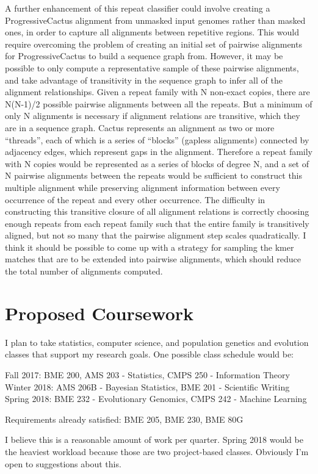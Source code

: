 \documentclass{article}
\begin{document}
A further enhancement of this repeat classifier could involve creating a ProgressiveCactus alignment from unmasked input genomes rather than masked ones, in order to capture all alignments between repetitive regions. This would require overcoming the problem of creating an initial set of pairwise alignments for ProgressiveCactus to build a sequence graph from. However, it may be possible to only compute a representative sample of these pairwise alignments, and take advantage of transitivity in the sequence graph to infer all of the alignment relationships. Given a repeat family with N non-exact copies, there are N(N-1)/2 possible pairwise alignments between all the repeats. But a minimum of only N alignments is necessary if alignment relations are transitive, which they are in a sequence graph. Cactus represents an alignment as two or more “threads”, each of which is a series of “blocks” (gapless alignments) connected by adjacency edges, which represent gaps in the alignment. Therefore a repeat family with N copies would be represented as a series of blocks of degree N, and a set of N pairwise alignments between the repeats would be sufficient to construct this multiple alignment while preserving alignment information between every occurrence of the repeat and every other occurrence. The difficulty in constructing this transitive closure of all alignment relations is correctly choosing enough repeats from each repeat family such that the entire family is transitively aligned, but not so many that the pairwise alignment step scales quadratically. I think it should be possible to come up with a strategy for sampling the kmer matches that are to be extended into pairwise alignments, which should reduce the total number of alignments computed.

\section{Proposed Coursework}
I plan to take statistics, computer science, and population genetics and evolution classes that support my research goals. One possible class schedule would be:


Fall 2017: BME 200, AMS 203 - Statistics, CMPS 250 - Information Theory
Winter 2018: AMS 206B - Bayesian Statistics, BME 201 - Scientific Writing
Spring 2018: BME 232 - Evolutionary Genomics, CMPS 242 - Machine Learning

Requirements already satisfied: BME 205, BME 230, BME 80G

I believe this is a reasonable amount of work per quarter. Spring 2018 would be the heaviest workload because those are two project-based classes. Obviously I’m open to suggestions about this.



\end{document}
